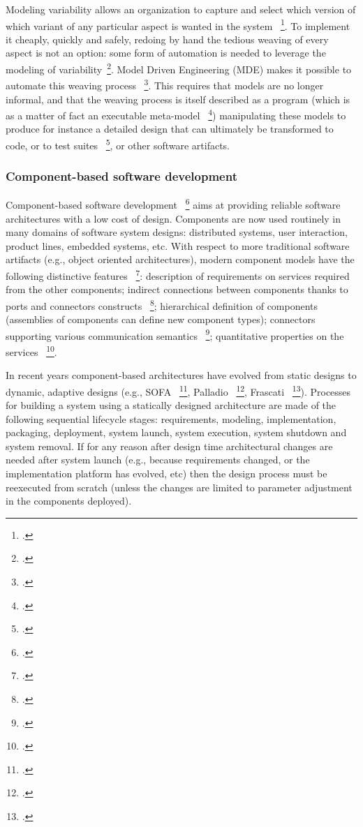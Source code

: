 Modeling variability allows an organization to capture and select which
version of which variant of any particular aspect is wanted in the
system~ \footcite{Bosch2002}. To implement it cheaply, quickly and safely, redoing by hand
the tedious weaving of every aspect is not an option: some form of automation
is needed to leverage the modeling of
variability~\footcite{batory2002}. Model Driven Engineering (MDE)
makes it possible to automate this weaving process~ \footcite{Jezequel08a}. This
requires that models are no longer informal, and that the weaving process is
itself described as a program (which is as a matter of fact an executable
meta-model~ \footcite{Muller05a}) manipulating these models to produce for instance a
detailed design that can ultimately be transformed to code, or to test
suites~ \footcite{Pickin07a}, or other software artifacts.

\subsubsection{Component-based software development}

Component-based software development~ \footcite{szyperski2002component} aims at providing reliable software architectures with a low cost of design.
Components are now used routinely in many domains of software system designs: 
distributed systems, user interaction, product lines, embedded systems, etc.
With respect to more traditional software artifacts (e.g., object oriented architectures),
modern component models have the following distinctive features~ \footcite{crnkovic2011classification}: 
description of requirements on services required from the other components;
indirect connections between components thanks to ports and connectors constructs~ \footcite{lau2005exogenous};
hierarchical definition of components (assemblies of components can define new component types);
connectors supporting various communication semantics~ \footcite{bures2006sofa};
quantitative properties on the services~ \footcite{beugnard2010contract}.

In recent years  component-based architectures have evolved from static designs to dynamic, adaptive designs (e.g., SOFA~ \footcite{bures2006sofa}, Palladio~ \footcite{Becker:2009cl}, Frascati~ \footcite{Melisson:2010it}).
Processes for building a system using a statically designed architecture are made of  the following sequential lifecycle stages: requirements, modeling, implementation, packaging, deployment, system launch, system execution, system shutdown and system removal.
If for any reason after design time architectural changes are needed after system launch (e.g., because requirements changed, or the implementation platform has evolved, etc) then the design process must be reexecuted from scratch 
(unless the changes are limited to parameter adjustment in the components deployed).

